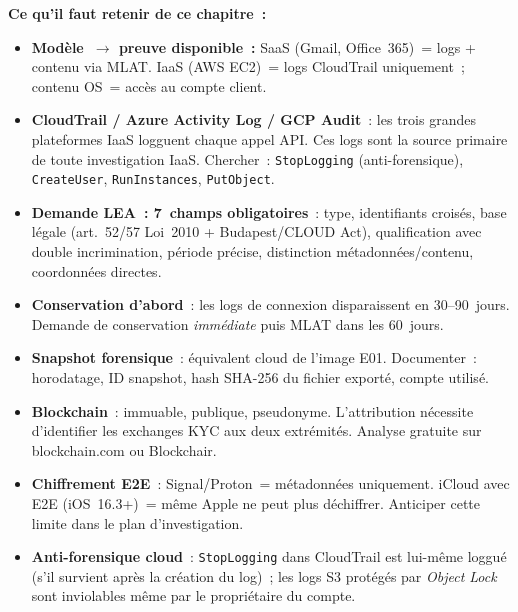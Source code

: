 \begin{boxresume}
\textbf{Ce qu'il faut retenir de ce chapitre~:}
\begin{itemize}
    \item \textbf{Modèle~$\to$ preuve disponible~:} SaaS (Gmail,
          Office~365)~= logs + contenu via MLAT. IaaS (AWS EC2)~=
          logs CloudTrail uniquement~; contenu OS~= accès au compte
          client.

    \item \textbf{CloudTrail / Azure Activity Log / GCP Audit}~:
          les trois grandes plateformes IaaS logguent chaque appel API.
          Ces logs sont la source primaire de toute investigation IaaS.
          Chercher~: \texttt{StopLogging} (anti-forensique),
          \texttt{CreateUser}, \texttt{RunInstances}, \texttt{PutObject}.

    \item \textbf{Demande LEA~: 7~champs obligatoires}~: type, identifiants
          croisés, base légale (art.~52/57 Loi~2010 + Budapest/CLOUD Act),
          qualification avec double incrimination, période précise,
          distinction métadonnées/contenu, coordonnées directes.

    \item \textbf{Conservation d'abord}~: les logs de connexion
          disparaissent en 30--90~jours. Demande de conservation
          \emph{immédiate} puis MLAT dans les 60~jours.

    \item \textbf{Snapshot forensique}~: équivalent cloud de l'image
          E01. Documenter~: horodatage, ID snapshot, hash SHA-256 du
          fichier exporté, compte utilisé.

    \item \textbf{Blockchain}~: immuable, publique, pseudonyme.
          L'attribution nécessite d'identifier les exchanges KYC
          aux deux extrémités. Analyse gratuite sur blockchain.com
          ou Blockchair.

    \item \textbf{Chiffrement E2E}~: Signal/Proton~= métadonnées
          uniquement. iCloud avec E2E (iOS~16.3+)~= même Apple ne
          peut plus déchiffrer. Anticiper cette limite dans le plan
          d'investigation.

    \item \textbf{Anti-forensique cloud}~: \texttt{StopLogging} dans
          CloudTrail est lui-même loggué (s'il survient après la
          création du log)~; les logs S3 protégés par \textit{Object Lock}
          sont inviolables même par le propriétaire du compte.
\end{itemize}
\end{boxresume}

